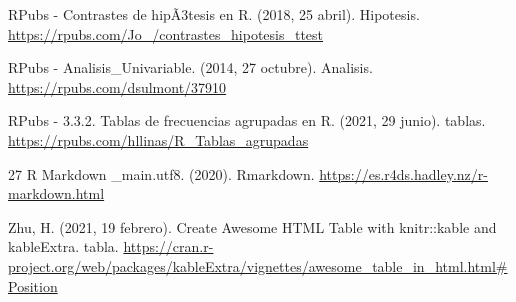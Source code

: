 \documentclass[
  man]{apa6}
\newlength{\cslhangindent}
\newlength{\cslentryspacingunit} %
\newenvironment{CSLReferences}[2] %
 {%
  \setlength{\parindent}{0pt}
  \ifodd #1
  \let\oldpar\par
  \def\par{\hangindent=\cslhangindent\oldpar}
  \fi
  \setlength{\parskip}{#2\cslentryspacingunit}
 }%
 {}
\begin{document}
RPubs - Contrastes de hipÃ3tesis en R. (2018, 25 abril). Hipotesis.
\url{https://rpubs.com/Jo_/contrastes_hipotesis_ttest}

RPubs - Analisis\_Univariable. (2014, 27 octubre). Analisis.
\url{https://rpubs.com/dsulmont/37910}

RPubs - 3.3.2. Tablas de frecuencias agrupadas en R. (2021, 29 junio).
tablas. \url{https://rpubs.com/hllinas/R_Tablas_agrupadas}

27 R Markdown \textbar{} \_main.utf8. (2020). Rmarkdown.
\url{https://es.r4ds.hadley.nz/r-markdown.html}

Zhu, H. (2021, 19 febrero). Create Awesome HTML Table with knitr::kable
and kableExtra. tabla.
\url{https://cran.r-project.org/web/packages/kableExtra/vignettes/awesome_table_in_html.html\#Position}

\hypertarget{refs}{}
\begin{CSLReferences}{0}{0}
\end{CSLReferences}

\endgroup
\end{document}
